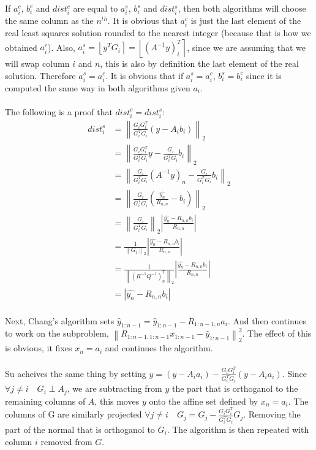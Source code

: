 \documentclass[11pt]{article}	%
\numberwithin{algorithm}{section}
\begin{document}
If $a_i^c$, $b_i^c$ and $dist_i^c$ are equal to $a_i^s$, $b_i^s$ and $dist_i^s$, then both algorithms will choose the same column as the $n^{th}$. It is obvious that $a_i^c$ is just the last element of the real least squares solution rounded to the nearest integer (because that is how we obtained $a_i^c$). Also, $a_i^s=\left \lfloor y^TG_i \right \rceil = \left \lfloor (A^{-1}y)^T_i \right \rceil$, since we are assuming that we will swap column $i$ and $n$, this is also by definition the last element of the real solution. Therefore $a_i^s = a_i^c$. It is obvious that if  $a_i^s = a_i^c$,  $b_i^s = b_i^c$ since it is computed the same way in both algorithms given $a_i$.\\\\

The following is a proof that $dist_i^c = dist_i^s$:
\begin{align*}
 dist_i^s&=\left \| \frac{G_iG_i^T}{G_i^TG_i}(y-A_ib_i) \right \|_2\\
&=\left \| \frac{G_iG_i^T}{G_i^TG_i}y - \frac{G_i}{G_i^TG_i}b_i \right \|_2\\
&=\left \| \frac{G_i}{G_i^TG_i}(A^{-1}y)_n - \frac{G_i}{G_i^TG_i}b_i \right \|_2\\
&=\left \| \frac{G_i}{G_i^TG_i}(\frac{\hat{y_n}}{R_{n,n}} - b_i) \right \|_2\\
&=\left \| \frac{G_i}{G_i^TG_i}\right \|_2  \left | \frac{\hat{y_n}-R_{n,n}b_i}{R_{n,n}} \right |  \\
&= \frac{1}{\left \|G_i\right \|_2}  \left | \frac{\hat{y_n}-R_{n,n}b_i}{R_{n,n}} \right |  \\
&= \frac{1}{\left \| (R^{-1}Q^{-1})_n^T \right \|_2}  \left | \frac{\hat{y_n}-R_{n,n}b_i}{R_{n,n}} \right |  \\
&= \left | \hat{y_n}-R_{n,n}b_i \right | \\
\end{align*}

Next, Chang's algorithm sets $\hat{y}_{1:n-1} = \hat{y}_{1:n-1} - R_{1:n-1,n}a_i$. And then continues to work on the subproblem, $\left \| R_{1:n-1,1:n-1}x_{1:n-1} - \hat{y}_{1:n-1} \right \|_2^2$. The effect of this is obvious, it fixes $x_n=a_i$ and continues the algorithm.\\\\

Su acheives the same thing by setting $y = (y-A_ia_i) - \frac{G_iG_i^T}{G_i^TG_i}(y-A_ia_i)$. Since $\forall{j\neq i}\quad G_i \perp A_j$, we are subtracting from $y$ the part that is orthoganol to the remaining columns of $A$, this moves $y$ onto the affine set defined by $x_n=a_i$. The columns of G are similarly projected $\forall{j\neq i}\quad G_j = G_j - \frac{G_iG_i^T}{G_i^TG_i}G_j$. Removing the part of the normal that is orthoganol to $G_i$. The algorithm is then repeated with column $i$ removed from $G$.
\end{document}
